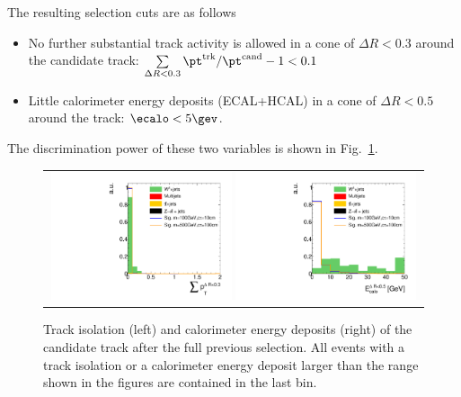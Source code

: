 The resulting selection cuts are as follows
\begin{itemize}
\renewcommand{\labelitemi}{\footnotesize{\ding{118}}}
\item No further substantial track activity is allowed in a cone of $\Delta R < 0.3$ around the candidate track: \mbox{$\sum \limits_{\Delta R < 0.3} \pt^{\text{trk}}/\pt^{\text{cand}} - 1 < 0.1$}
\item Little calorimeter energy deposits (ECAL+HCAL) in a cone of $\Delta R < 0.5$ around the track: \mbox{$\ecalo<5\gev$}.
\end{itemize}
The discrimination power of these two variables is shown in Fig.~\ref{fig:TrackIso_Ecalo_After_Preselection}.\\
\begin{figure}[!b]
  \centering 
  \begin{tabular}{c}
    \includegraphics[width=0.49\textwidth]{figures/analysis/AnalysisSelection/chiTracksCandidateSelectionTrigger_2Signals_FullBkg/htrackIsolation_lin.pdf}
    \includegraphics[width=0.49\textwidth]{figures/analysis/AnalysisSelection/chiTracksCandidateSelectionTrigger_2Signals_FullBkg/htrackCaloIsolation_lin.pdf}
  \end{tabular}
  \caption{Track isolation (left) and calorimeter energy deposits (right) of the candidate track after the full previous selection. 
           All events with a track isolation or a calorimeter energy deposit larger than the range shown in the figures are contained in the last bin.}
  \label{fig:TrackIso_Ecalo_After_Preselection}
\end{figure}

